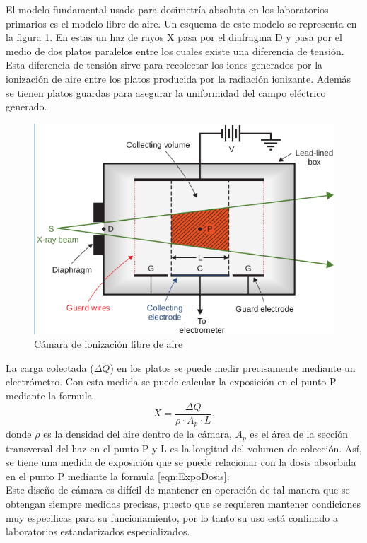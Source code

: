 El modelo fundamental usado para dosimetría absoluta en los laboratorios primarios es el modelo libre de aire. Un esquema de este modelo se representa en la figura  \ref{fig:freeAir}. En estas un haz de rayos X pasa por el diafragma D y pasa por el medio de dos platos paralelos entre los cuales existe una diferencia de tensión. Esta diferencia de tensión sirve para recolectar los iones generados por la ionización de aire entre los platos producida por la radiación ionizante. Además se tienen platos guardas para asegurar la uniformidad del campo eléctrico generado.\\
\begin{figure}[H]
	\centering
	\includegraphics[width=0.7\linewidth]{images/freeAirChamber.png}
	\caption{Cámara de ionización libre de aire\cite{khan2014the}}
	\label{fig:freeAir}
\end{figure}

La carga colectada ($\Delta Q$) en los platos se puede medir precisamente mediante un electrómetro. Con esta medida se puede calcular la exposición en el punto P mediante la formula 
 \begin{equation}
X=\frac{\Delta Q}{\rho \cdot A_{p}\cdot L}.
\end{equation}
donde $\rho$ es la densidad del aire dentro de la cámara, $A_{p}$ es el área de la sección transversal del haz en el punto P y L es la longitud del volumen de colección. Así, se tiene una medida de exposición que se puede relacionar con la dosis absorbida en el punto P mediante la formula \eqref{eqn:ExpoDosis}.\\

Este diseño de cámara es difícil de mantener en operación de tal manera que se obtengan siempre medidas precisas, puesto que se requieren mantener condiciones muy especificas para su funcionamiento, por lo tanto su uso está confinado a laboratorios estandarizados especializados.\\
 
